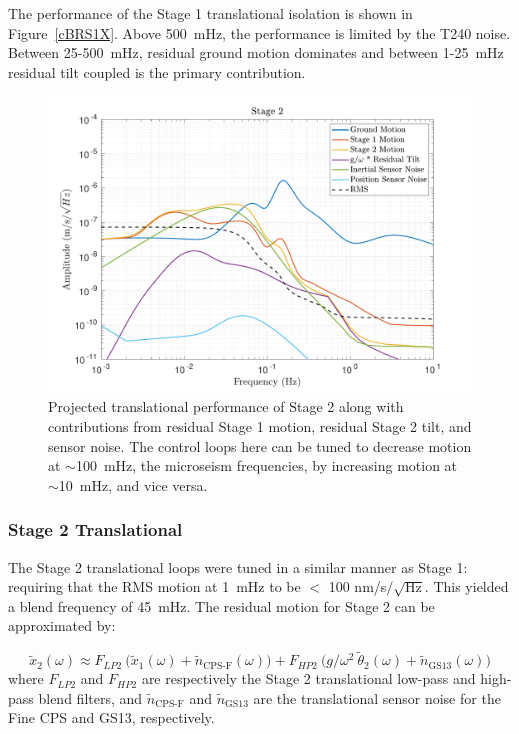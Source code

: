 \documentclass [12pt, proquest]{uwthesis}[2019]
\begin{document}
The performance of the Stage 1 translational isolation is shown in Figure~\ref{cBRS1X}. Above 500~mHz, the performance is limited by the T240 noise. Between 25-500~mHz, residual ground motion dominates and between 1-25~mHz residual tilt coupled is the primary contribution. 

\begin{figure}[!h]
\begin{center}
\includegraphics[width=\textwidth]{cBRS_Model_ST2X.pdf}
\caption[Projected translational performance of Stage 2] {Projected translational performance of Stage 2 along with contributions from residual Stage 1 motion, residual Stage 2 tilt, and sensor noise.  The control loops here can be tuned to decrease motion at $\sim$100~mHz, the microseism frequencies, by increasing motion at $\sim$10~mHz, and vice versa.}
\label{cBRS2X}
\end{center}
\end{figure}

\subsubsection{Stage 2 Translational}

The Stage 2 translational loops were tuned in a similar manner as Stage 1: requiring that the RMS motion at 1~mHz to be $<$ 100 nm/s$/\sqrt{\text{Hz}}$. This yielded  a blend frequency of 45~mHz. The residual motion for Stage 2 can be approximated by:

\begin{equation}
\tilde{x}_2(\omega)\approx F_{LP2}\ \big(\tilde{x}_1(\omega)+\tilde{n}_\text{CPS-F}(\omega)\big)+F_{HP2}\ \big( g/\omega^2\ \tilde{\theta}_2(\omega) +\tilde{n}_\text{GS13}(\omega) \big)
\end{equation}
where $F_{LP2}$ and $F_{HP2}$ are respectively the Stage 2 translational low-pass and high-pass blend filters, and $\tilde{n}_\text{CPS-F}$ and $\tilde{n}_\text{GS13}$ are the translational sensor noise for the Fine CPS and GS13, respectively.
\end{document}
